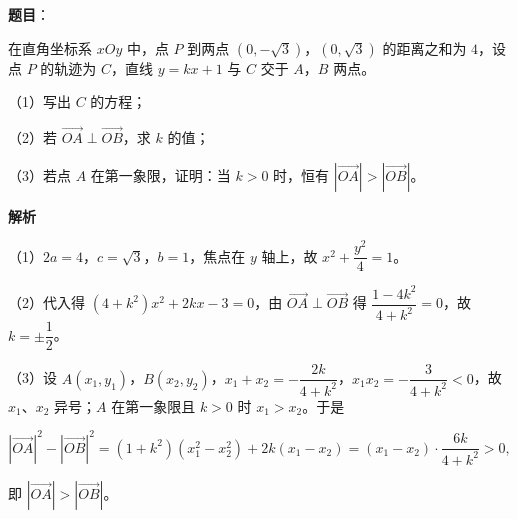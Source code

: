 \begin{answer}

\textbf{题目}：

在直角坐标系 $xOy$ 中，点 $P$ 到两点 $(0,-\sqrt3)$，$(0,\sqrt3)$ 的距离之和为 $4$，设点 $P$ 的轨迹为 $C$，直线 $y=kx+1$ 与 $C$ 交于 $A$，$B$ 两点。

（1）写出 $C$ 的方程；

（2）若 $\overrightarrow{OA}\perp\overrightarrow{OB}$，求 $k$ 的值；

（3）若点 $A$ 在第一象限，证明：当 $k>0$ 时，恒有 $\left|\overrightarrow{OA}\right|>\left|\overrightarrow{OB}\right|$。

\textbf{解析}

（1）$2a=4$，$c=\sqrt3$，$b=1$，焦点在 $y$ 轴上，故 $x^2+\dfrac{y^2}4=1$。

（2）代入得 $(4+k^2)x^2+2kx-3=0$，由 $\overrightarrow{OA}\perp\overrightarrow{OB}$ 得 $\dfrac{1-4k^2}{4+k^2}=0$，故 $k=\pm\dfrac12$。

（3）设 $A(x_1,y_1)$，$B(x_2,y_2)$，$x_1+x_2=-\dfrac{2k}{4+k^2}$，$x_1x_2=-\dfrac3{4+k^2}<0$，故 $x_1$、$x_2$ 异号；$A$ 在第一象限且 $k>0$ 时 $x_1>x_2$。于是

\nopagebreak[4]
\[\left|\overrightarrow{OA}\right|^2-\left|\overrightarrow{OB}\right|^2=(1+k^2)(x_1^2-x_2^2)+2k(x_1-x_2)=(x_1-x_2)\cdot\frac{6k}{4+k^2}>0,\]

即 $\left|\overrightarrow{OA}\right|>\left|\overrightarrow{OB}\right|$。


\end{answer}
